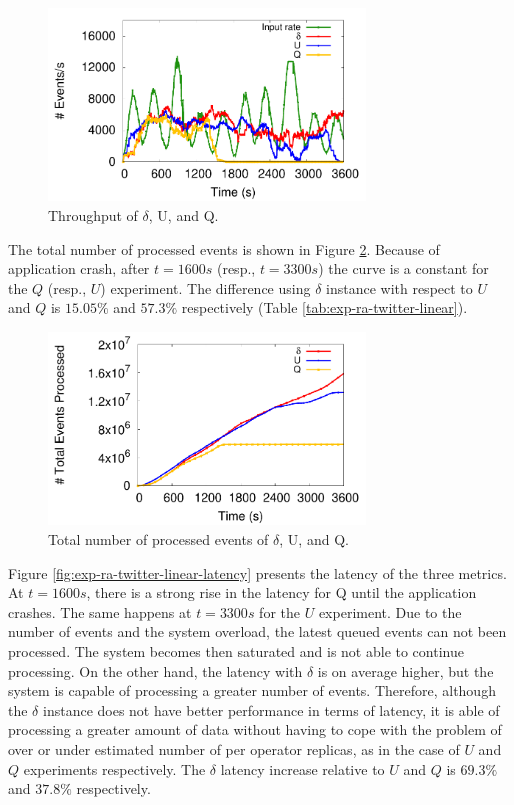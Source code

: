 \begin{figure}[!ht]
    \centering
    \includegraphics[width=0.75\textwidth]{figures/exp/reactive/TwitterLinear-Throughput.pdf}
    \caption{Throughput of  $\delta$, U, and Q.}
    \label{fig:exp-ra-twitter-linear-throughput}
\end{figure}

The total number of processed events is shown in Figure \ref{fig:exp-ra-twitter-linear-exec-total}. Because of application crash, after $ t = 1600s$ (resp., $ t = 3300s $) the curve is a constant for the $Q$ (resp., $U$) experiment. The difference using $\delta$ instance with respect to $U$ and $Q$ is $15.05\%$ and $57.3 \%$ respectively (Table \ref{tab:exp-ra-twitter-linear}).  

\begin{figure}[!ht]
    \centering
    \includegraphics[width=0.75\textwidth]{figures/exp/reactive/TwitterLinear-ExecutedTotal.pdf}
    \caption{Total number of processed events of $\delta$, U,  and  Q.}
    \label{fig:exp-ra-twitter-linear-exec-total}
\end{figure}

Figure \ref{fig:exp-ra-twitter-linear-latency} presents the latency of the three metrics. At $ t = 1600s $, there is a strong rise in the latency for Q until the application crashes. The same happens at $ t = 3300s $ for the $U$ experiment. Due to the number of events and the system overload, the latest queued events can not been processed. The system becomes then saturated and is not able to continue processing. On the other hand, the latency with $ \delta $ is on average higher, but the system is capable of processing a greater number of events. Therefore, although the $ \delta $ instance does not have better performance in terms of latency, it is able of processing a greater amount of data without having to cope with the problem of over or under estimated  number of per operator replicas, as in the case of $U$ and $Q$ experiments respectively. The $ \delta $ latency increase  relative to $U$ and $Q$ is $69.3\%$ and $37.8\%$ respectively. 

